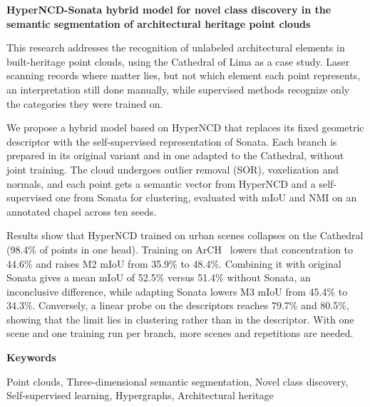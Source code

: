 
\begin{center}
\vspace{-1.0cm}
\normalsize\textbf{HyperNCD-Sonata hybrid model for novel class discovery in the\\semantic segmentation of architectural heritage point clouds}
\end{center}
\vspace{-0.4cm}

This research addresses the recognition of unlabeled architectural elements in
built-heritage point clouds, using the Cathedral of Lima as a case study. Laser
scanning records where matter lies, but not which element each point represents,
an interpretation still done manually, while supervised methods recognize only
the categories they were trained on.

We propose a hybrid model based on HyperNCD that replaces its fixed geometric
descriptor with the self-supervised representation of Sonata. Each branch is
prepared in its original variant and in one adapted to the Cathedral, without
joint training. The cloud undergoes outlier removal (SOR), voxelization and
normals, and each point gets a semantic vector from HyperNCD and a
self-supervised one from Sonata for clustering, evaluated with mIoU and NMI on
an annotated chapel across ten seeds.

Results show that HyperNCD trained on urban scenes collapses on the Cathedral
(98.4\% of points in one head). Training on ArCH~\cite{matrone2020benchmark}
lowers that concentration to 44.6\% and raises M2 mIoU from 35.9\% to 48.4\%.
Combining it with original Sonata gives a mean mIoU of 52.5\% versus 51.4\%
without Sonata, an inconclusive difference, while adapting Sonata lowers M3 mIoU
from 45.4\% to 34.3\%. Conversely, a linear probe on the descriptors reaches
79.7\% and 80.5\%, showing that the limit lies in clustering rather than in the
descriptor. With one scene and one training run per branch, more scenes and
repetitions are needed.

\vspace{0.2em}

\noindent\begin{minipage}{\linewidth}
\noindent\textbf{Keywords}\par
\noindent Point clouds, Three-dimensional semantic segmentation, Novel class
discovery, Self-supervised learning, Hypergraphs, Architectural heritage
\end{minipage}
